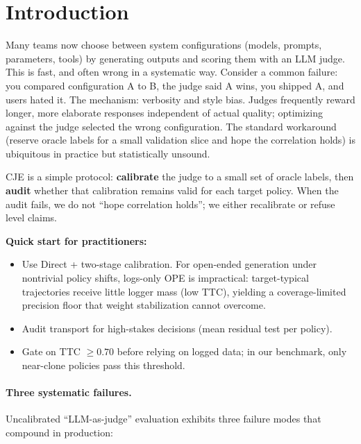 \section{Introduction}
\label{sec:intro}

Many teams now choose between system configurations (models, prompts, parameters, tools) by generating outputs and scoring them with an LLM judge. This is fast, and often wrong in a systematic way. Consider a common failure: you compared configuration A to B, the judge said A wins, you shipped A, and users hated it. The mechanism: verbosity and style bias. Judges frequently reward longer, more elaborate responses independent of actual quality; optimizing against the judge selected the wrong configuration. The standard workaround (reserve oracle labels for a small validation slice and hope the correlation holds) is ubiquitous in practice but statistically unsound.

CJE is a simple protocol: \textbf{calibrate} the judge to a small set of oracle labels, then \textbf{audit} whether that calibration remains valid for each target policy. When the audit fails, we do not ``hope correlation holds''; we either recalibrate or refuse level claims.

\noindent\textbf{Quick start for practitioners:}
\begin{itemize}[leftmargin=*,nosep]
\item Use Direct + two-stage calibration. For open-ended generation under nontrivial policy shifts, logs-only OPE is impractical: target-typical trajectories receive little logger mass (low TTC), yielding a coverage-limited precision floor that weight stabilization cannot overcome.
\item Audit transport for high-stakes decisions (mean residual test per policy).
\item Gate on TTC $\geq 0.70$ before relying on logged data; in our benchmark, only near-clone policies pass this threshold.
\end{itemize}

\paragraph{Three systematic failures.}
Uncalibrated ``LLM-as-judge'' evaluation exhibits three failure modes that compound in production:


